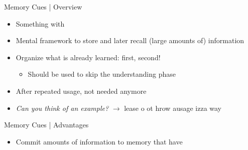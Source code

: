 \documentclass{ercisbeamer}
\begin{document}
\begin{frame}{Memory Cues | Overview}
    \begin{tbox}
        \begin{itemize}
            \item Something with 
            \item Mental framework to store and later recall (large amounts of) information
            \item Organize what is already learned:  first,  second!
            \begin{itemize}
                \item Should  be used to skip the understanding phase
            \end{itemize} 
            \item After repeated usage, not needed anymore
            \item \emph{Can you think of an example?} \pause
            $\rightarrow$ lease o ot hrow ausage izza way 
        \end{itemize}
    \end{tbox}
\end{frame}
\setbgimage{}

\begin{frame}{Memory Cues | Advantages}
    \begin{itemize}
        \item Commit  amounts of information to memory that have 
    \end{itemize}
\end{frame}
\end{document}
